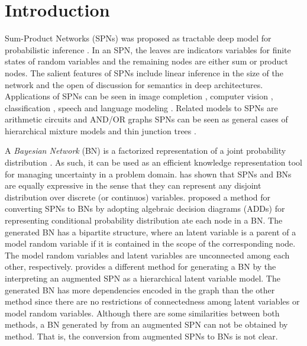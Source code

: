 \section{Introduction}

Sum-Product Networks (SPNs) was proposed as tractable deep model for probabilistic inference \cite{poon2011sum}.
In an SPN, the leaves are indicators variables for finite states of random variables and the remaining nodes are either sum or product nodes. 
The salient features of SPNs include linear inference in the size of the network and the open of discussion for semantics in deep architectures.
Applications of SPNs can be seen in image completion \cite{poon2011sum,dennis2012learning,peharz2013greedy}, computer vision \cite{amer2012sum}, classification \cite{gens2012discriminative}, speech and language modeling \cite{peharz2014modeling,cheng2014language,zohrer2015representation}.
Related models to SPNs are arithmetic circuits \cite{darwiche2003differential} and AND/OR graphs \cite{dechter2007and}
SPNs can be seen as general cases of hierarchical mixture models \cite{zhang2004hierarchical} and thin junction trees \cite{chechetka2008efficient}.


A \emph{Bayesian Network} (BN) is a factorized representation of a joint probability distribution \cite{pear88,koll09,codd70,cowell2006probabilistic,kjaerulffMadsen13}. 
As such, it can be used as an efficient knowledge representation tool for managing uncertainty in a problem domain. 
\cite{poon2011sum} has shown that SPNs and BNs are equally expressive in the sense that they can represent any disjoint distribution over discrete (or continuos) variables.
\cite{zhao2015relationship} proposed a method for converting SPNs to BNs by adopting algebraic decision diagrams (ADDs) \cite{bahar1997algebric} for representing conditional probability distribution ate each node in a BN.
The generated BN has a bipartite structure, where an latent variable is a parent of a model random variable if it is contained in the scope of the corresponding node.
The model random variables and latent variables are unconnected among each other, respectively.
\cite{peharz2015theoretical} provides a different method for generating a BN by the interpreting an augmented SPN as a hierarchical latent variable model.
The generated BN has more dependencies encoded in the graph than the other method since there are no restrictions of connectedness among latent variables or model random variables.  
Although there are some similarities between both methods, a BN generated by \cite{peharz2015theoretical} from an augmented SPN can not be obtained by \cite{zhao2015relationship} method.
That is, the conversion from augmented SPNs to BNs is not clear.


